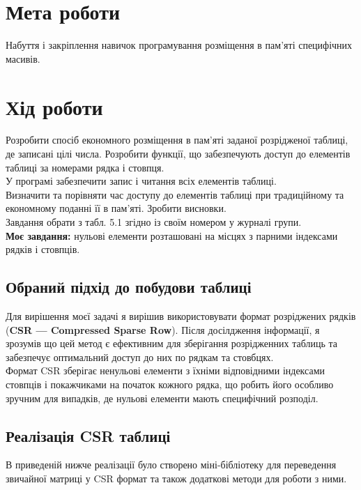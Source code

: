 \section{Мета роботи}
Набуття і закріплення навичок програмування розміщення в пам’яті специфічних масивів.

\section{Хід роботи}
    Розробити спосіб економного розміщення в пам’яті заданої
розрідженої таблиці, де записані цілі числа. Розробити функції, що
забезпечують доступ до елементів таблиці за номерами рядка і стовпця.\\

    У програмі забезпечити запис і читання всіх елементів таблиці.\\

    Визначити та порівняти час доступу до елементів таблиці при
традиційному та економному поданні її в пам’яті. Зробити висновки.\\

    Завдання обрати з табл. 5.1 згідно із своїм номером у журналі групи.\\

    \textbf{Моє завдання:} нульові елементи розташовані на місцях з парними індексами
    рядків і стовпців.


\subsection{Обраний підхід до побудови таблиці}
Для вирішення моєї задачі я вирішив використовувати формат розріджених рядків (\textbf{CSR — Compressed Sparse Row}). Після досілдження інформації, я зрозумів що цей метод є ефективним для зберігання розрідженних таблиць та забезпечує оптимальний доступ до них по рядкам та стовбцях. \\

    Формат CSR зберігає ненульові елементи з їхніми відповідними індексами стовпців і 
покажчиками на початок кожного рядка, що робить його особливо зручним для випадків, де 
нульові елементи мають специфічний розподіл.

\clearpage
\subsection{Реалізація CSR таблиці}

    В приведеній нижче реалізації було створено міні-бібліотеку для переведення
звичайної матриці у CSR формат та також додаткові методи для роботи з ними.\\


